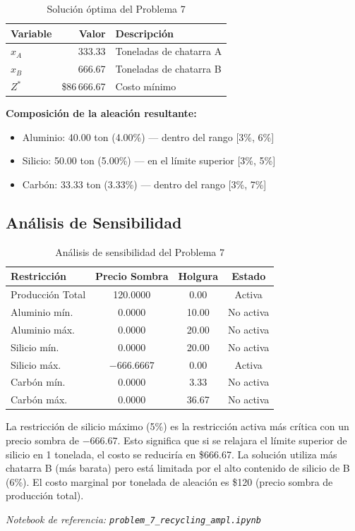 \documentclass[12pt,a4paper]{article}
\begin{document}
\begin{table}[h]
\centering
\begin{tabular}{lrl}
\toprule
\textbf{Variable} & \textbf{Valor} & \textbf{Descripción} \\
\midrule
$x_A$ & 333.33 & Toneladas de chatarra A \\
$x_B$ & 666.67 & Toneladas de chatarra B \\
$Z^*$ & \$86\,666.67 & Costo mínimo \\
\bottomrule
\end{tabular}
\caption{Solución óptima del Problema 7}
\end{table}

\textbf{Composición de la aleación resultante:}
\begin{itemize}[nosep]
    \item Aluminio: 40.00 ton (4.00\%) --- dentro del rango [3\%, 6\%] \checkmark
    \item Silicio: 50.00 ton (5.00\%) --- en el límite superior [3\%, 5\%] \checkmark
    \item Carbón: 33.33 ton (3.33\%) --- dentro del rango [3\%, 7\%] \checkmark
\end{itemize}

\subsection{Análisis de Sensibilidad}

\begin{table}[h]
\centering
\begin{tabular}{lccc}
\toprule
\textbf{Restricción} & \textbf{Precio Sombra} & \textbf{Holgura} & \textbf{Estado} \\
\midrule
Producción Total & 120.0000 & 0.00 & Activa \\
Aluminio mín. & 0.0000 & 10.00 & No activa \\
Aluminio máx. & 0.0000 & 20.00 & No activa \\
Silicio mín. & 0.0000 & 20.00 & No activa \\
Silicio máx. & $-666.6667$ & 0.00 & Activa \\
Carbón mín. & 0.0000 & 3.33 & No activa \\
Carbón máx. & 0.0000 & 36.67 & No activa \\
\bottomrule
\end{tabular}
\caption{Análisis de sensibilidad del Problema 7}
\end{table}

La restricción de silicio máximo (5\%) es la restricción activa más crítica con un precio sombra de $-666.67$. Esto significa que si se relajara el límite superior de silicio en 1 tonelada, el costo se reduciría en \$666.67. La solución utiliza más chatarra B (más barata) pero está limitada por el alto contenido de silicio de B (6\%). El costo marginal por tonelada de aleación es \$120 (precio sombra de producción total).

\textit{Notebook de referencia: \texttt{problem\_7\_recycling\_ampl.ipynb}}
\end{document}
